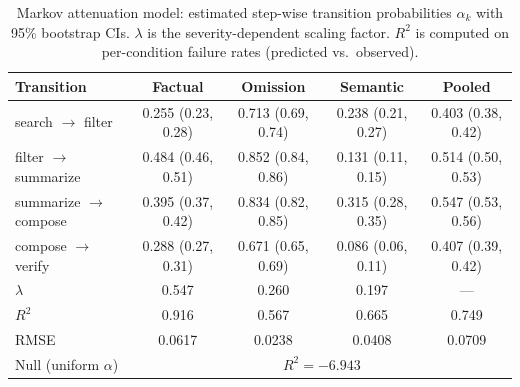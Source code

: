 \begin{table}[t]
\centering
\small
\caption{Markov attenuation model: estimated step-wise transition probabilities $\alpha_k$ with 95\% bootstrap CIs. $\lambda$ is the severity-dependent scaling factor. $R^2$ is computed on per-condition failure rates (predicted vs.\ observed).}
\label{tab:markov}
\begin{tabular}{lcccc}
\toprule
Transition & Factual & Omission & Semantic & Pooled \\
\midrule
search $\to$ filter & 0.255 (0.23, 0.28) & 0.713 (0.69, 0.74) & 0.238 (0.21, 0.27) & 0.403 (0.38, 0.42) \\
filter $\to$ summarize & 0.484 (0.46, 0.51) & 0.852 (0.84, 0.86) & 0.131 (0.11, 0.15) & 0.514 (0.50, 0.53) \\
summarize $\to$ compose & 0.395 (0.37, 0.42) & 0.834 (0.82, 0.85) & 0.315 (0.28, 0.35) & 0.547 (0.53, 0.56) \\
compose $\to$ verify & 0.288 (0.27, 0.31) & 0.671 (0.65, 0.69) & 0.086 (0.06, 0.11) & 0.407 (0.39, 0.42) \\
\midrule
$\lambda$ & 0.547 & 0.260 & 0.197 & --- \\
$R^2$ & 0.916 & 0.567 & 0.665 & 0.749 \\
RMSE & 0.0617 & 0.0238 & 0.0408 & 0.0709 \\
\midrule
Null (uniform $\alpha$) & \multicolumn{4}{c}{$R^2 = -6.943$} \\
\bottomrule
\end{tabular}
\end{table}